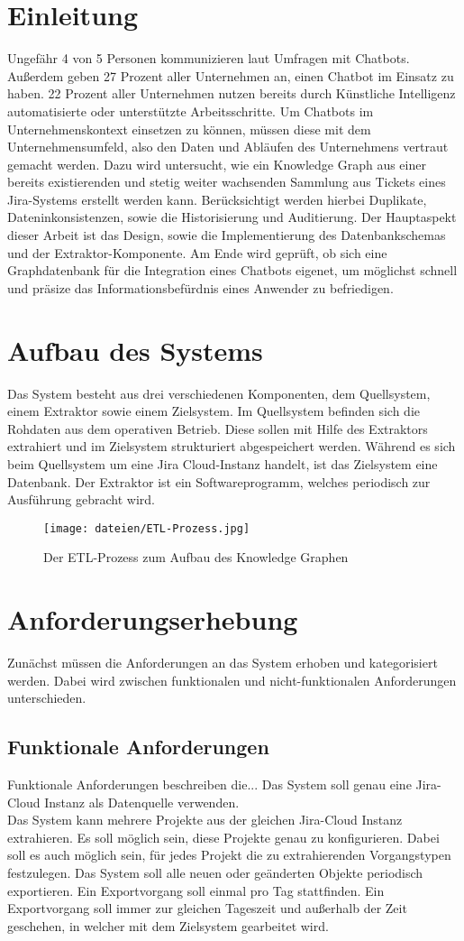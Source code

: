 \documentclass[10pt]{article}
\begin{document}
\section{Einleitung}
Ungefähr 4 von 5 Personen kommunizieren laut Umfragen mit Chatbots. Außerdem geben 27 Prozent aller Unternehmen an, einen Chatbot im Einsatz zu haben. 22 Prozent aller Unternehmen nutzen bereits durch Künstliche Intelligenz automatisierte oder unterstützte Arbeitsschritte. Um Chatbots im Unternehmenskontext einsetzen zu können, müssen diese mit dem Unternehmensumfeld, also den Daten und Abläufen des Unternehmens vertraut gemacht werden. Dazu wird untersucht, wie ein Knowledge Graph aus einer bereits existierenden und stetig weiter wachsenden Sammlung aus Tickets eines Jira-Systems erstellt werden kann. Berücksichtigt werden hierbei Duplikate, Dateninkonsistenzen, sowie die Historisierung und Auditierung. Der Hauptaspekt dieser Arbeit ist das Design, sowie die Implementierung des Datenbankschemas und der Extraktor-Komponente. Am Ende wird geprüft, ob sich eine Graphdatenbank für die Integration eines Chatbots eigenet, um möglichst schnell und präsize das Informationsbefürdnis eines Anwender zu befriedigen.
\section{Aufbau des Systems}
Das System besteht aus drei verschiedenen Komponenten, dem Quellsystem, einem Extraktor sowie einem Zielsystem. Im Quellsystem befinden sich die Rohdaten aus dem operativen Betrieb. Diese sollen mit Hilfe des Extraktors extrahiert und im Zielsystem strukturiert abgespeichert werden. Während es sich beim Quellsystem um eine Jira Cloud-Instanz handelt, ist das Zielsystem eine Datenbank. Der Extraktor ist ein Softwareprogramm, welches periodisch zur Ausführung gebracht wird.
\begin{figure}[h]
\centering
\texttt{[image: dateien/ETL-Prozess.jpg]}
\caption{Der ETL-Prozess zum Aufbau des Knowledge Graphen}
\label{fig:meine-grafik}
\end{figure}
\section{Anforderungserhebung}
Zunächst müssen die Anforderungen an das System erhoben und kategorisiert werden. Dabei wird zwischen funktionalen und nicht-funktionalen Anforderungen unterschieden.
\subsection{Funktionale Anforderungen}
Funktionale Anforderungen beschreiben die...
Das System soll genau eine Jira-Cloud Instanz als Datenquelle verwenden. \\
Das System kann mehrere Projekte aus der gleichen Jira-Cloud Instanz extrahieren. Es soll möglich sein, diese Projekte genau zu konfigurieren. Dabei soll es auch möglich sein, für jedes Projekt die zu extrahierenden Vorgangstypen festzulegen.
Das System soll alle neuen oder geänderten Objekte periodisch exportieren. Ein Exportvorgang soll einmal pro Tag stattfinden. Ein Exportvorgang soll immer zur gleichen Tageszeit und außerhalb der Zeit geschehen, in welcher mit dem Zielsystem gearbeitet wird.
\end{document}
